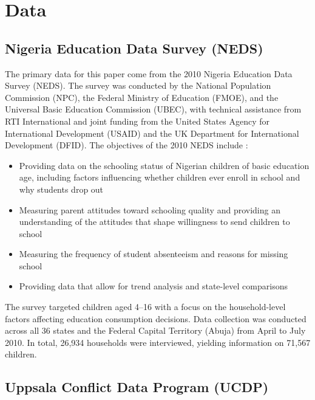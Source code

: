
\section{Data}
\label{sec:data}

\subsection{Nigeria Education Data Survey (NEDS)}

The primary data for this paper come from the 2010 Nigeria Education Data
Survey (NEDS). The survey was conducted by the National Population Commission
(NPC), the Federal Ministry of Education (FMOE), and the Universal Basic
Education Commission (UBEC), with technical assistance from RTI
International and joint funding from the United States Agency for
International Development (USAID) and the UK Department for International
Development (DFID). The objectives of the 2010 NEDS include
\citep{neds2010}:

\begin{itemize}
    \item Providing data on the schooling status of Nigerian children of
          basic education age, including factors influencing whether children
          ever enroll in school and why students drop out
    \item Measuring parent attitudes toward schooling quality and providing
          an understanding of the attitudes that shape willingness to send
          children to school
    \item Measuring the frequency of student absenteeism and reasons for
          missing school
    \item Providing data that allow for trend analysis and state-level
          comparisons
\end{itemize}

The survey targeted children aged 4--16 with a focus on the household-level
factors affecting education consumption decisions. Data collection was
conducted across all 36 states and the Federal Capital Territory (Abuja)
from April to July 2010. In total, 26,934 households were interviewed,
yielding information on 71,567 children.

\subsection{Uppsala Conflict Data Program (UCDP)}

